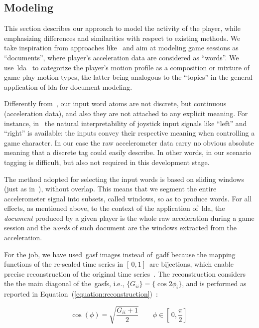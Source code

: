 \subsection{Modeling}
This section describes our approach to model the activity of the player, while emphasizing differences and similarities with respect to existing methods. We take inspiration from approaches like~\cite{smith_mining_2016, wang_encoding_2015, wang_imaging_2015} and aim at modeling game sessions as ``documents'', where player's acceleration data are considered as ``words''. We use~\gls{lda}~\cite{blei_latent_2003} to categorize the player's motion profile as a composition or mixture of game play motion types, the latter being analogous to the ``topics'' in the general application of \gls{lda} for document modeling.

Differently from~\cite{smith_mining_2016}, our input word atoms are not discrete, but continuous (acceleration data), and also they are not attached to any explicit meaning. For instance, in~\cite{smith_mining_2016} the natural interpretability of joystick input signals like ``left'' and ``right'' is available: the inputs convey their respective meaning when controlling a game character. In our case the raw accelerometer data carry no obvious absolute meaning that a discrete tag could easily describe. In other words, in our scenario tagging is difficult, but also not required in this development stage.

The method adopted for selecting the input words is based on sliding windows (just as in~\cite{smith_mining_2016}), without overlap. This means that we segment the entire accelerometer signal into subsets, called windows, so as to produce words. For all effects, as mentioned above, to the context of the application of~\gls{lda}, the \textit{document} produced by a given player is the whole raw acceleration during a game session and the \textit{words} of such document are the windows extracted from the acceleration.

For the job, we have used~\gls{gasf} images instead of~\gls{gadf} because the mapping functions of the re-scaled time series in $[\,0,1]\,$ are bijections, which enable precise reconstruction of the original time series~\citep{wang_imaging_2015}. The reconstruction considers the the main diagonal of the~\gls{gasf}s, i.e., $\{G_{ii}\} = \{\cos{2\phi_{i}}\}$, and is performed as reported in Equation~(\ref{equation:reconstruction})~\cite{wang_imaging_2015}:

\begin{equation}\label{equation:reconstruction}
    \cos(\phi)=\sqrt{\frac{G_{ii}+1}{2}} \qquad \phi \in [\,0,\frac{\pi}{2}]\,
\end{equation}

